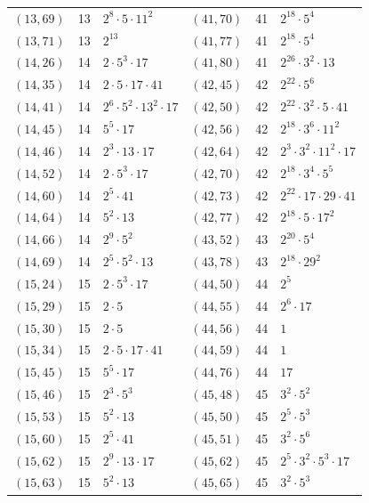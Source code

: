 \documentclass[11pt]{article}
\begin{document}
\begin{longtable}{@{}lrl@{\qquad}lrl@{}}
$(13,69)$ & 13 & $2^{8}\cdot 5\cdot 11^{2}$ & $(41,70)$ & 41 & $2^{18}\cdot 5^{4}$\\
$(13,71)$ & 13 & $2^{13}$ & $(41,77)$ & 41 & $2^{18}\cdot 5^{4}$\\
$(14,26)$ & 14 & $2\cdot 5^{3}\cdot 17$ & $(41,80)$ & 41 & $2^{26}\cdot 3^{2}\cdot 13$\\
$(14,35)$ & 14 & $2\cdot 5\cdot 17\cdot 41$ & $(42,45)$ & 42 & $2^{22}\cdot 5^{6}$\\
$(14,41)$ & 14 & $2^{6}\cdot 5^{2}\cdot 13^{2}\cdot 17$ & $(42,50)$ & 42 & $2^{22}\cdot 3^{2}\cdot 5\cdot 41$\\
$(14,45)$ & 14 & $5^{5}\cdot 17$ & $(42,56)$ & 42 & $2^{18}\cdot 3^{6}\cdot 11^{2}$\\
$(14,46)$ & 14 & $2^{3}\cdot 13\cdot 17$ & $(42,64)$ & 42 & $2^{3}\cdot 3^{2}\cdot 11^{2}\cdot 17$\\
$(14,52)$ & 14 & $2\cdot 5^{3}\cdot 17$ & $(42,70)$ & 42 & $2^{18}\cdot 3^{4}\cdot 5^{5}$\\
$(14,60)$ & 14 & $2^{5}\cdot 41$ & $(42,73)$ & 42 & $2^{22}\cdot 17\cdot 29\cdot 41$\\
$(14,64)$ & 14 & $5^{2}\cdot 13$ & $(42,77)$ & 42 & $2^{18}\cdot 5\cdot 17^{2}$\\
$(14,66)$ & 14 & $2^{9}\cdot 5^{2}$ & $(43,52)$ & 43 & $2^{20}\cdot 5^{4}$\\
$(14,69)$ & 14 & $2^{5}\cdot 5^{2}\cdot 13$ & $(43,78)$ & 43 & $2^{18}\cdot 29^{2}$\\
$(15,24)$ & 15 & $2\cdot 5^{3}\cdot 17$ & $(44,50)$ & 44 & $2^{5}$\\
$(15,29)$ & 15 & $2\cdot 5$ & $(44,55)$ & 44 & $2^{6}\cdot 17$\\
$(15,30)$ & 15 & $2\cdot 5$ & $(44,56)$ & 44 & $1$\\
$(15,34)$ & 15 & $2\cdot 5\cdot 17\cdot 41$ & $(44,59)$ & 44 & $1$\\
$(15,45)$ & 15 & $5^{5}\cdot 17$ & $(44,76)$ & 44 & $17$\\
$(15,46)$ & 15 & $2^{3}\cdot 5^{3}$ & $(45,48)$ & 45 & $3^{2}\cdot 5^{2}$\\
$(15,53)$ & 15 & $5^{2}\cdot 13$ & $(45,50)$ & 45 & $2^{5}\cdot 5^{3}$\\
$(15,60)$ & 15 & $2^{5}\cdot 41$ & $(45,51)$ & 45 & $3^{2}\cdot 5^{6}$\\
$(15,62)$ & 15 & $2^{9}\cdot 13\cdot 17$ & $(45,62)$ & 45 & $2^{5}\cdot 3^{2}\cdot 5^{3}\cdot 17$\\
$(15,63)$ & 15 & $5^{2}\cdot 13$ & $(45,65)$ & 45 & $3^{2}\cdot 5^{3}$\\

\end{longtable}
\end{document}
